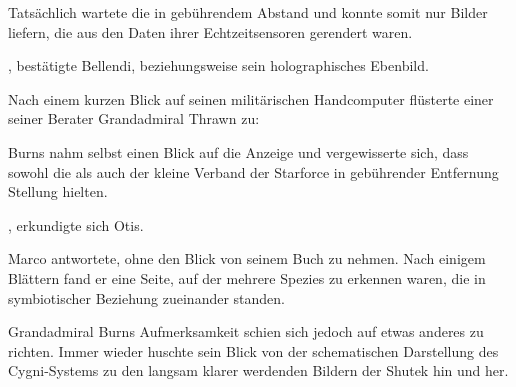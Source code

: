 \par

Tatsächlich wartete die  in gebührendem Abstand und konnte somit nur Bilder liefern, die aus den Daten ihrer Echtzeitsensoren gerendert waren.

\par

, bestätigte Bellendi, beziehungsweise sein holographisches Ebenbild. 

\par

Nach einem kurzen Blick auf seinen militärischen Handcomputer flüsterte einer seiner Berater Grandadmiral Thrawn zu: 

\par

Burns nahm selbst einen Blick auf die Anzeige und vergewisserte sich, dass sowohl die  als auch der kleine Verband der Starforce in gebührender Entfernung Stellung hielten.

\par

, erkundigte sich Otis.

\par

Marco antwortete, ohne den Blick von seinem Buch zu nehmen.  Nach einigem Blättern fand er eine Seite, auf der mehrere Spezies zu erkennen waren, die in symbiotischer Beziehung zueinander standen. 

\par

Grandadmiral Burns Aufmerksamkeit schien sich jedoch auf etwas anderes zu richten. Immer wieder huschte sein Blick von der schematischen Darstellung des Cygni-Systems zu den langsam klarer werdenden Bildern der Shutek hin und her. 

